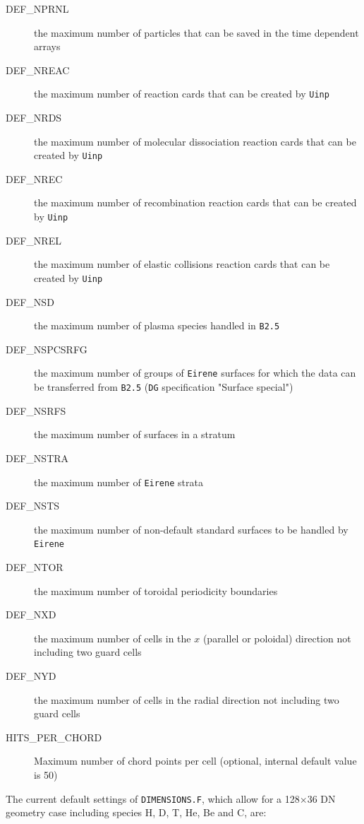 \documentclass[a4paper,10pt]{report}
\begin{document}
\begin{description}
\item[DEF\_NPRNL] the maximum number of
particles that can be saved in the time dependent arrays
\item[DEF\_NREAC] the maximum number of
reaction cards that can be created by {\tt Uinp}
\item[DEF\_NRDS] the maximum number of
molecular dissociation reaction cards that can be created by {\tt Uinp}
\item[DEF\_NREC] the maximum number of
recombination reaction cards that can be created by {\tt Uinp}
\item[DEF\_NREL] the maximum number of
elastic collisions reaction cards that can be created by {\tt Uinp}
\item[DEF\_NSD] the maximum number of plasma
species handled in {\tt B2.5}
\item[DEF\_NSPCSRFG] the maximum
number of groups of {\tt Eirene} surfaces for which the data can be
transferred from {\tt B2.5} ({\tt DG} specification "Surface special")
\item[DEF\_NSRFS] the maximum number of
surfaces in a stratum
\item[DEF\_NSTRA] the maximum number of
{\tt Eirene} strata
\item[DEF\_NSTS] the maximum number of non-default
standard surfaces to be handled by {\tt Eirene}
\item[DEF\_NTOR] the maximum number of toroidal
periodicity boundaries
\item[DEF\_NXD] the maximum number of cells
in the $x$ (parallel or poloidal) direction not including two guard
cells
\item[DEF\_NYD] the maximum number of cells
in the radial direction not including two guard cells
\item[HITS\_PER\_CHORD]  Maximum number of chord points per cell (optional, internal default value is 50)
\end{description}

The current default settings of {\tt DIMENSIONS.F}, which allow for a
128$\times$36 DN geometry case including species H, D, T, He, Be and C, are:
\end{document}
